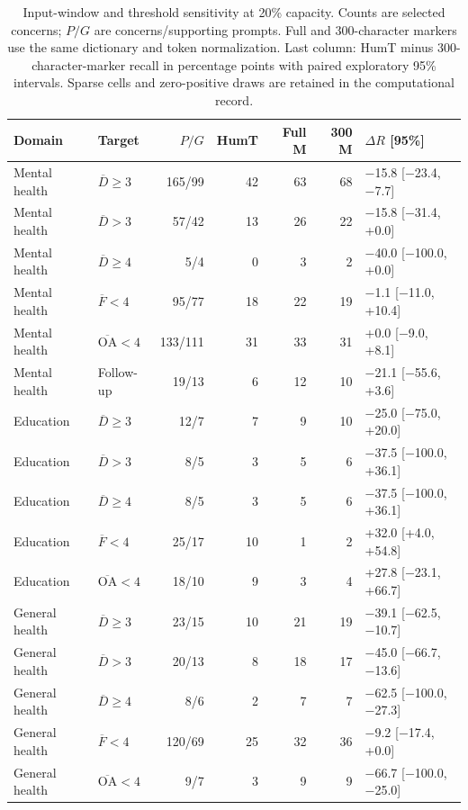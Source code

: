 \begin{table}[t]
\centering\small
\caption{Input-window and threshold sensitivity at 20\% capacity. Counts are selected concerns; $P/G$ are concerns/supporting prompts. Full and 300-character markers use the same dictionary and token normalization. Last column: HumT minus 300-character-marker recall in percentage points with paired exploratory 95\% intervals. Sparse cells and zero-positive draws are retained in the computational record.}
\label{tab:prefix_threshold}
\begin{tabular}{llrrrrl}
\toprule
Domain & Target & $P/G$ & HumT & Full M & 300 M & $\Delta R$ [95\%] \\
\midrule
Mental health & $\overline D\geq3$ & 165/99 & 42 & 63 & 68 & \ensuremath{-}15.8 [\ensuremath{-}23.4, \ensuremath{-}7.7] \\
Mental health & $\overline D>3$ & 57/42 & 13 & 26 & 22 & \ensuremath{-}15.8 [\ensuremath{-}31.4, +0.0] \\
Mental health & $\overline D\geq4$ & 5/4 & 0 & 3 & 2 & \ensuremath{-}40.0 [\ensuremath{-}100.0, +0.0] \\
Mental health & $\overline F<4$ & 95/77 & 18 & 22 & 19 & \ensuremath{-}1.1 [\ensuremath{-}11.0, +10.4] \\
Mental health & $\overline{\mathrm{OA}}<4$ & 133/111 & 31 & 33 & 31 & +0.0 [\ensuremath{-}9.0, +8.1] \\
Mental health & Follow-up & 19/13 & 6 & 12 & 10 & \ensuremath{-}21.1 [\ensuremath{-}55.6, +3.6] \\
Education & $\overline D\geq3$ & 12/7 & 7 & 9 & 10 & \ensuremath{-}25.0 [\ensuremath{-}75.0, +20.0] \\
Education & $\overline D>3$ & 8/5 & 3 & 5 & 6 & \ensuremath{-}37.5 [\ensuremath{-}100.0, +36.1] \\
Education & $\overline D\geq4$ & 8/5 & 3 & 5 & 6 & \ensuremath{-}37.5 [\ensuremath{-}100.0, +36.1] \\
Education & $\overline F<4$ & 25/17 & 10 & 1 & 2 & +32.0 [+4.0, +54.8] \\
Education & $\overline{\mathrm{OA}}<4$ & 18/10 & 9 & 3 & 4 & +27.8 [\ensuremath{-}23.1, +66.7] \\
General health & $\overline D\geq3$ & 23/15 & 10 & 21 & 19 & \ensuremath{-}39.1 [\ensuremath{-}62.5, \ensuremath{-}10.7] \\
General health & $\overline D>3$ & 20/13 & 8 & 18 & 17 & \ensuremath{-}45.0 [\ensuremath{-}66.7, \ensuremath{-}13.6] \\
General health & $\overline D\geq4$ & 8/6 & 2 & 7 & 7 & \ensuremath{-}62.5 [\ensuremath{-}100.0, \ensuremath{-}27.3] \\
General health & $\overline F<4$ & 120/69 & 25 & 32 & 36 & \ensuremath{-}9.2 [\ensuremath{-}17.4, +0.0] \\
General health & $\overline{\mathrm{OA}}<4$ & 9/7 & 3 & 9 & 9 & \ensuremath{-}66.7 [\ensuremath{-}100.0, \ensuremath{-}25.0] \\
\bottomrule
\end{tabular}
\end{table}
